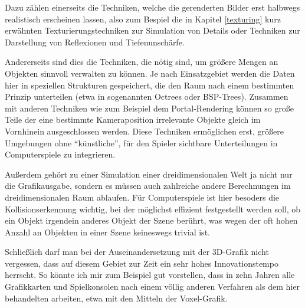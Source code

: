 Dazu zählen einerseits die Techniken, welche die gerenderten Bilder erst halbwegs realistisch erscheinen lassen, also zum Bespiel die in Kapitel \ref{texturing} kurz erwähnten Texturierungstechniken zur Simulation von Details oder Techniken zur Darstellung von Reflexionen und Tiefenunschärfe.

Andererseits sind dies die Techniken, die nötig sind, um größere Mengen an Objekten sinnvoll verwalten zu können. Je nach Einsatzgebiet werden die Daten hier in speziellen Strukturen gespeichert, die den Raum nach einem bestimmten Prinzip unterteilen (etwa in sogenannten Octrees oder BSP-Trees). Zusammen mit anderen Techniken wie zum Beispiel dem Portal-Rendering können so große Teile der eine bestimmte Kameraposition irrelevante Objekte gleich im Vornhinein ausgeschlossen werden. Diese Techniken ermöglichen erst, größere Umgebungen ohne \enquote{künstliche}, für den Spieler sichtbare Unterteilungen in Computerspiele zu integrieren.

Außerdem gehört zu einer Simulation einer dreidimensionalen Welt ja nicht nur die Grafikausgabe, sondern es müssen auch zahlreiche andere Berechnungen im dreidimensionalen Raum ablaufen. Für Computerspiele ist hier besoders die Kollisionserkennung wichtig, bei der möglichst effizient festgestellt werden soll, ob ein Objekt irgendein anderes Objekt der Szene berührt, was wegen der oft hohen Anzahl an Objekten in einer Szene keineswegs trivial ist.

Schließlich darf man bei der Auseinandersetzung mit der 3D-Grafik nicht vergessen, dass auf diesem Gebiet zur Zeit ein sehr hohes Innovationstempo herrscht. So könnte ich mir zum Beispiel gut vorstellen, dass in zehn Jahren alle Grafikkarten und Spielkonsolen nach einem völlig anderen Verfahren als dem hier behandelten arbeiten, etwa mit den Mitteln der Voxel-Grafik. \missing
